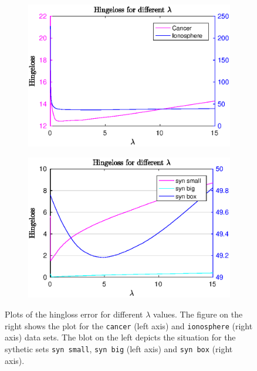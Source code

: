 \begin{figure}[H]
	\begin{subfigure}{0.49\textwidth}
		\includegraphics[width=\textwidth]{Pictures/Plots/lambda_vs_err_io_ca_final.eps}%
	\end{subfigure}
	\begin{subfigure}{0.49\textwidth}
		\includegraphics[width=\textwidth]{Pictures/Plots/lambda_vs_err_ss_sb_b5_final.eps}%
	\end{subfigure}
	\caption{Plots of the hingloss error for different $\lambda$ values. The figure on the right shows the plot for the \textup{\texttt{cancer}} (left axis) and \textup{\texttt{ionosphere}} (right axis) data sets. The blot on the left depicts the situation for the sythetic sets \textup{\texttt{syn small}}, \textup{\texttt{syn big}} (left axis) and \textup{\texttt{syn box}} (right axis).}%
	\label{fig_lambda_vs_err}%
\end{figure}


